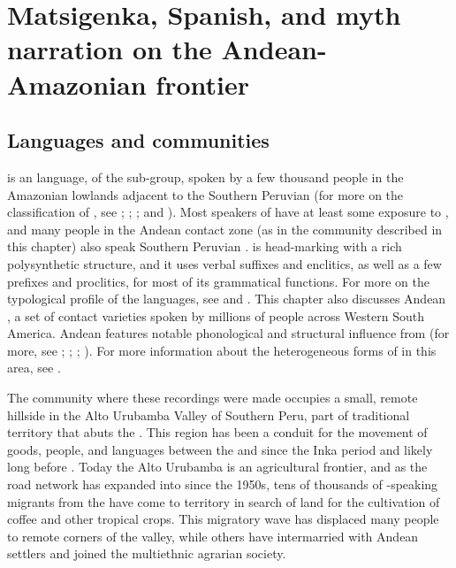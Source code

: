 \documentclass[output=paper]{LSP/langsci}
\begin{document}
\section{Matsigenka, Spanish, and myth narration on the Andean-Amazonian frontier}
\label{Emmayth.narration}
\subsection{Languages and communities}
\label{Emland.comm}
 is an  language, of the  sub-group, spoken by a few thousand people in the Amazonian lowlands adjacent to the Southern Peruvian  (for more on the classification of , see \citealt{aikhenvald1999}; \citealt[][212--219]{michael08}; \citealt{michael10}; and \citealt{payne81}). Most speakers of  have at least some exposure to , and many people in the Andean contact zone (as in the community described in this chapter) also speak Southern Peruvian  \citep{emlen.2017}.  is head-marking with a rich polysynthetic structure, and it uses verbal suffixes and enclitics, as well as a few prefixes and proclitics, for most of its grammatical functions. For more on the typological profile of the  languages, see \citet{michael08} and \citet{mihas15}. This chapter also discusses Andean , a set of contact varieties spoken by millions of people across Western South America. Andean  features notable phonological and structural influence from  (for more, see \citealt[][593--595]{adelaar2004}; \citealt{babel18}; \citealt{cerron03}; \citealt{escobar03}). For more information about the heterogeneous forms of  in this area, see \citet{emlenforth}.
 
The community where these recordings were made occupies a small, remote hillside in the  {Alto Urubamba} Valley of Southern Peru, part of traditional  territory that abuts the . This region has been a conduit for the movement of goods, people, and languages between the  and  since the Inka period and likely long before \citep{Gade1972,camino.1977}. Today the {Alto Urubamba} is an agricultural frontier, and as the road network has expanded into  since the 1950s, tens of thousands of -speaking migrants from the  have come to  territory in search of land for the cultivation of coffee and other tropical crops. This migratory wave has displaced many  people to remote corners of the valley, while others have intermarried with Andean settlers and joined the multiethnic agrarian society.
\end{document}
